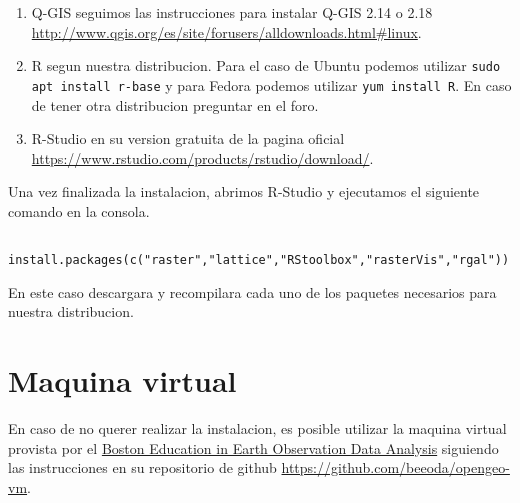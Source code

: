 \begin{enumerate}
  \item Q-GIS seguimos las instrucciones para instalar Q-GIS 2.14 o 2.18 \url{http://www.qgis.org/es/site/forusers/alldownloads.html#linux}.
  \item R segun nuestra distribucion. Para el caso de Ubuntu podemos utilizar \texttt{sudo apt install r-base} y para Fedora podemos utilizar \texttt{yum install R}. En caso de tener otra distribucion preguntar en el foro.
  \item R-Studio en su version gratuita de la pagina oficial \url{https://www.rstudio.com/products/rstudio/download/}.
\end{enumerate}

Una vez finalizada la instalacion, abrimos R-Studio y ejecutamos el siguiente comando en la consola.

\begin{lstlisting}
  install.packages(c("raster","lattice","RStoolbox","rasterVis","rgal"))
\end{lstlisting}

En este caso descargara y recompilara cada uno de los paquetes necesarios para nuestra distribucion.

\section{Maquina virtual}

En caso de no querer realizar la instalacion, es posible utilizar la maquina virtual provista por el \href{www.beeoda.org}{Boston Education in Earth Observation Data Analysis} siguiendo las instrucciones en su repositorio de github \url{https://github.com/beeoda/opengeo-vm}.

